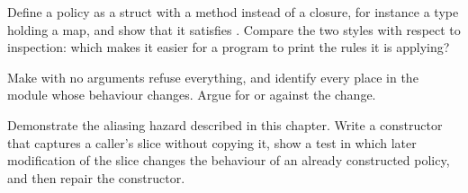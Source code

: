 \begin{exercise}
Define a policy as a struct with a method instead of a closure, for instance a  type holding a map, and show that it satisfies . Compare the two styles with respect to inspection: which makes it easier for a program to print the rules it is applying?
\end{exercise}

\begin{exercise}
Make  with no arguments refuse everything, and identify every place in the module whose behaviour changes. Argue for or against the change.
\end{exercise}

\begin{exercise}
Demonstrate the aliasing hazard described in this chapter. Write a constructor that captures a caller's slice without copying it, show a test in which later modification of the slice changes the behaviour of an already constructed policy, and then repair the constructor.
\end{exercise}
